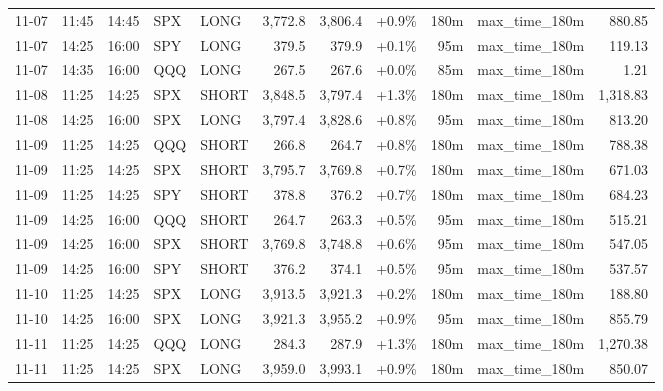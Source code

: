 \documentclass[11pt,a4paper,twoside]{article}
\begin{document}
\begin{center}
\begin{longtable}{>{\color{txtmain}}l l l l l r r r r >{\color{txtmain}}l r}
11-07 & 11:45 & 14:45 & SPX & LONG & 3,772.8 & 3,806.4 & \textcolor{wingreen}{+0.9\%} & 180m & max\_time\_180m & \textcolor{wingreen}{880.85} \\
11-07 & 14:25 & 16:00 & SPY & LONG & 379.5 & 379.9 & \textcolor{wingreen}{+0.1\%} & 95m & max\_time\_180m & \textcolor{wingreen}{119.13} \\
11-07 & 14:35 & 16:00 & QQQ & LONG & 267.5 & 267.6 & \textcolor{wingreen}{+0.0\%} & 85m & max\_time\_180m & \textcolor{wingreen}{1.21} \\
11-08 & 11:25 & 14:25 & SPX & SHORT & 3,848.5 & 3,797.4 & \textcolor{wingreen}{+1.3\%} & 180m & max\_time\_180m & \textcolor{wingreen}{1,318.83} \\
11-08 & 14:25 & 16:00 & SPX & LONG & 3,797.4 & 3,828.6 & \textcolor{wingreen}{+0.8\%} & 95m & max\_time\_180m & \textcolor{wingreen}{813.20} \\
11-09 & 11:25 & 14:25 & QQQ & SHORT & 266.8 & 264.7 & \textcolor{wingreen}{+0.8\%} & 180m & max\_time\_180m & \textcolor{wingreen}{788.38} \\
11-09 & 11:25 & 14:25 & SPX & SHORT & 3,795.7 & 3,769.8 & \textcolor{wingreen}{+0.7\%} & 180m & max\_time\_180m & \textcolor{wingreen}{671.03} \\
11-09 & 11:25 & 14:25 & SPY & SHORT & 378.8 & 376.2 & \textcolor{wingreen}{+0.7\%} & 180m & max\_time\_180m & \textcolor{wingreen}{684.23} \\
11-09 & 14:25 & 16:00 & QQQ & SHORT & 264.7 & 263.3 & \textcolor{wingreen}{+0.5\%} & 95m & max\_time\_180m & \textcolor{wingreen}{515.21} \\
11-09 & 14:25 & 16:00 & SPX & SHORT & 3,769.8 & 3,748.8 & \textcolor{wingreen}{+0.6\%} & 95m & max\_time\_180m & \textcolor{wingreen}{547.05} \\
11-09 & 14:25 & 16:00 & SPY & SHORT & 376.2 & 374.1 & \textcolor{wingreen}{+0.5\%} & 95m & max\_time\_180m & \textcolor{wingreen}{537.57} \\
11-10 & 11:25 & 14:25 & SPX & LONG & 3,913.5 & 3,921.3 & \textcolor{wingreen}{+0.2\%} & 180m & max\_time\_180m & \textcolor{wingreen}{188.80} \\
11-10 & 14:25 & 16:00 & SPX & LONG & 3,921.3 & 3,955.2 & \textcolor{wingreen}{+0.9\%} & 95m & max\_time\_180m & \textcolor{wingreen}{855.79} \\
11-11 & 11:25 & 14:25 & QQQ & LONG & 284.3 & 287.9 & \textcolor{wingreen}{+1.3\%} & 180m & max\_time\_180m & \textcolor{wingreen}{1,270.38} \\
11-11 & 11:25 & 14:25 & SPX & LONG & 3,959.0 & 3,993.1 & \textcolor{wingreen}{+0.9\%} & 180m & max\_time\_180m & \textcolor{wingreen}{850.07} \\

\end{longtable}
\end{center}
\end{document}
